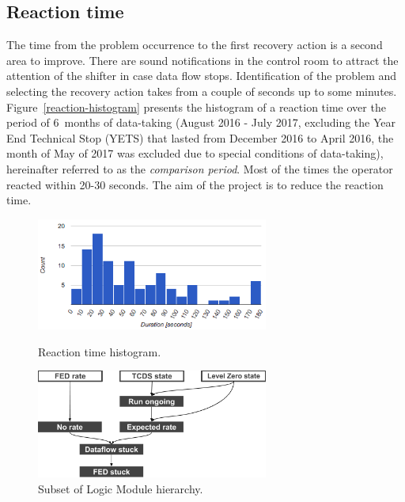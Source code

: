 \documentclass[a4paper]{jpconf}
\begin{document}
\subsection{Reaction time} \label{reaction-section}
The time from the problem occurrence to the first recovery action is a second area to improve. There are sound notifications in the control room to attract the attention of the shifter in case data flow stops. Identification of the problem and selecting the recovery action takes from a couple of seconds up to some minutes. Figure~\ref{reaction-histogram} presents the histogram of a reaction time over the period of 6~months of data-taking (August 2016 - July 2017, excluding the Year End Technical Stop (YETS) that lasted from December 2016 to April 2016, the month of May of 2017 was excluded due to special conditions of data-taking), hereinafter referred to as the {\it comparison period}. Most of the times the operator reacted within 20-30 seconds. The aim of the project is to reduce the reaction time.

\begin{figure}[h]
\begin{minipage}{18pc}
\includegraphics[width=18pc]{reaction-histogram-2016.png}
\caption{\label{reaction-histogram}Reaction time histogram.}
\end{minipage}\hspace{2pc}%
\begin{minipage}{18pc}
\includegraphics[width=18pc]{logic-module-hierarchy.png}
\caption{\label{subsetoflm}Subset of Logic Module hierarchy.}
\end{minipage} 
\end{figure}
\end{document}
